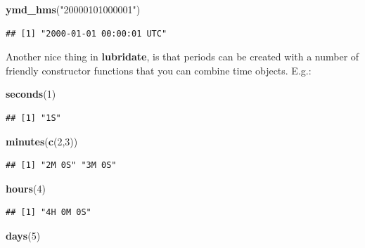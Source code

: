 \documentclass[]{book}
\newenvironment{Shaded}{\begin{snugshade}}{\end{snugshade}}
\newcommand{\KeywordTok}[1]{\textcolor[rgb]{0.13,0.29,0.53}{\textbf{#1}}}
\newcommand{\DecValTok}[1]{\textcolor[rgb]{0.00,0.00,0.81}{#1}}
\newcommand{\StringTok}[1]{\textcolor[rgb]{0.31,0.60,0.02}{#1}}
\newcommand{\NormalTok}[1]{#1}
\theoremstyle{definition}
\theoremstyle{definition}
\theoremstyle{definition}
\theoremstyle{remark}
\begin{document}
\begin{Shaded}
\begin{Highlighting}[]
\KeywordTok{ymd_hms}\NormalTok{(}\StringTok{"20000101000001"}\NormalTok{)}
\end{Highlighting}
\end{Shaded}

\begin{verbatim}
## [1] "2000-01-01 00:00:01 UTC"
\end{verbatim}

Another nice thing in \textbf{lubridate}, is that periods can be created
with a number of friendly constructor functions that you can combine
time objects. E.g.:

\begin{Shaded}
\begin{Highlighting}[]
\KeywordTok{seconds}\NormalTok{(}\DecValTok{1}\NormalTok{)}
\end{Highlighting}
\end{Shaded}

\begin{verbatim}
## [1] "1S"
\end{verbatim}

\begin{Shaded}
\begin{Highlighting}[]
\KeywordTok{minutes}\NormalTok{(}\KeywordTok{c}\NormalTok{(}\DecValTok{2}\NormalTok{,}\DecValTok{3}\NormalTok{))}
\end{Highlighting}
\end{Shaded}

\begin{verbatim}
## [1] "2M 0S" "3M 0S"
\end{verbatim}

\begin{Shaded}
\begin{Highlighting}[]
\KeywordTok{hours}\NormalTok{(}\DecValTok{4}\NormalTok{)}
\end{Highlighting}
\end{Shaded}

\begin{verbatim}
## [1] "4H 0M 0S"
\end{verbatim}

\begin{Shaded}
\begin{Highlighting}[]
\KeywordTok{days}\NormalTok{(}\DecValTok{5}\NormalTok{)}
\end{Highlighting}
\end{Shaded}
\end{document}
